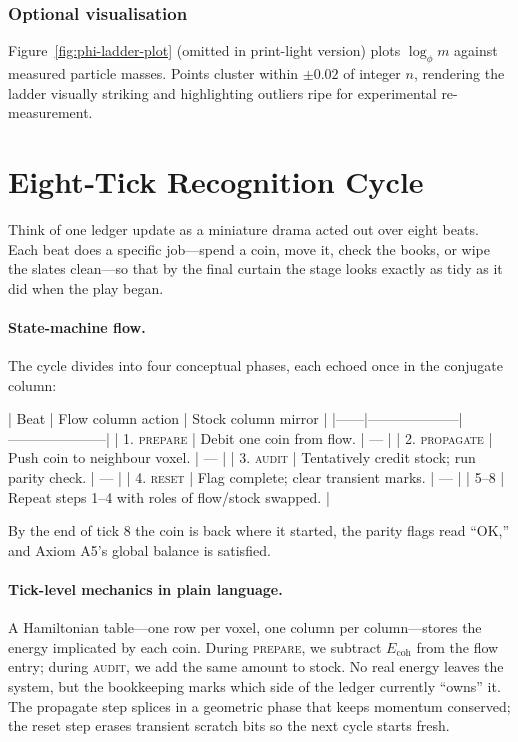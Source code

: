 \documentclass[11pt,oneside]{book}
\begin{document}
\subsubsection{Optional visualisation}
\label{subsubsec:ladder-plot}
Figure~\ref{fig:phi-ladder-plot} (omitted in print-light version) plots
\(\log_{\phi} m\) against measured particle masses.  Points cluster within
\(\pm0.02\) of integer \(n\), rendering the ladder visually striking and
highlighting outliers ripe for experimental re-measurement.

\section{Eight‐Tick Recognition Cycle}
\label{sec:eight-tick-cycle}

Think of one ledger update as a miniature drama acted out over eight beats.  
Each beat does a specific job—spend a coin, move it, check the books, or wipe
the slates clean—so that by the final curtain the stage looks exactly as tidy
as it did when the play began.

\paragraph{State-machine flow.}
The cycle divides into four conceptual phases, each echoed once in the
conjugate column:

| Beat | Flow column action | Stock column mirror |
|------|--------------------|---------------------|
| 1. \textsc{prepare}   | Debit one coin from flow. | — |
| 2. \textsc{propagate} | Push coin to neighbour voxel. | — |
| 3. \textsc{audit}     | Tentatively credit stock; run parity check. | — |
| 4. \textsc{reset}     | Flag complete; clear transient marks. | — |
| 5–8 | Repeat steps 1–4 with roles of flow/stock swapped. |

By the end of tick 8 the coin is back where it started, the parity flags read
“OK,” and Axiom A5’s global balance is satisfied.

\paragraph{Tick-level mechanics in plain language.}
A Hamiltonian table—one row per voxel, one column per column—stores the energy
implicated by each coin.  During \textsc{prepare}, we subtract \(E_{\text{coh}}\)
from the flow entry; during \textsc{audit}, we add the same amount to stock.
No real energy leaves the system, but the bookkeeping marks which side of the
ledger currently “owns” it.  The propagate step splices in a geometric phase
that keeps momentum conserved; the reset step erases transient scratch bits so
the next cycle starts fresh.
\end{document}
